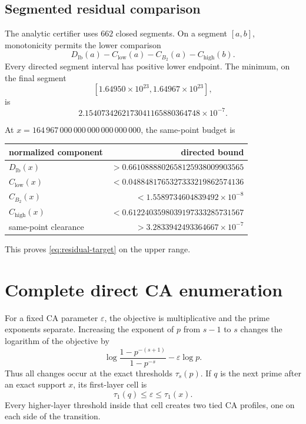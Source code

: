 \documentclass[11pt,a4paper]{article}
\numberwithin{equation}{section}
\theoremstyle{definition}
\newcommand{\Xmax}{164\,967\,000\,000\,000\,000\,000\,000}
\begin{document}
\subsection{Segmented residual comparison}

The analytic certifier uses \(662\) closed segments.  On a segment
\([a,b]\), monotonicity permits the lower comparison
\begin{equation}\label{eq:segment-comparison}
  D_{\mathrm{lb}}(a)
  -C_{\mathrm{low}}(a)
  -C_{B_2}(a)
  -C_{\mathrm{high}}(b).
\end{equation}
Every directed segment interval has positive lower endpoint.  The minimum,
on the final segment
\[
  [1.64950\times10^{23},1.64967\times10^{23}],
\]
is
\begin{equation}\label{eq:min-clearance}
  2.1540734262173041165880364748\times10^{-7}.
\end{equation}

At \(x=\Xmax\), the same-point budget is
\begin{center}
\begin{tabular}{lr}
\toprule
normalized component & directed bound\\
\midrule
\(D_{\mathrm{lb}}(x)\) &
\(>0.6610888802658125938009903565\)\\
\(C_{\mathrm{low}}(x)\) &
\(<0.0488481765327333219862574136\)\\
\(C_{B_2}(x)\) &
\(<1.5589734604839492\times10^{-8}\)\\
\(C_{\mathrm{high}}(x)\) &
\(<0.6122403598039197333285731567\)\\
\midrule
same-point clearance &
\(>3.2833942493364667\times10^{-7}\)\\
\bottomrule
\end{tabular}
\end{center}
This proves \eqref{eq:residual-target} on the upper range.

\section{Complete direct CA enumeration}

For a fixed CA parameter \(\varepsilon\), the objective is multiplicative and
the prime exponents separate.  Increasing the exponent of \(p\) from
\(s-1\) to \(s\) changes the logarithm of the objective by
\[
  \log\frac{1-p^{-(s+1)}}{1-p^{-s}}
  -\varepsilon\log p.
\]
Thus all changes occur at the exact thresholds \(\tau_s(p)\).  If \(q\) is
the next prime after an exact support \(x\), its first-layer cell is
\[
  \tau_1(q)\le\varepsilon\le\tau_1(x).
\]
Every higher-layer threshold inside that cell creates two tied CA profiles,
one on each side of the transition.
\end{document}
